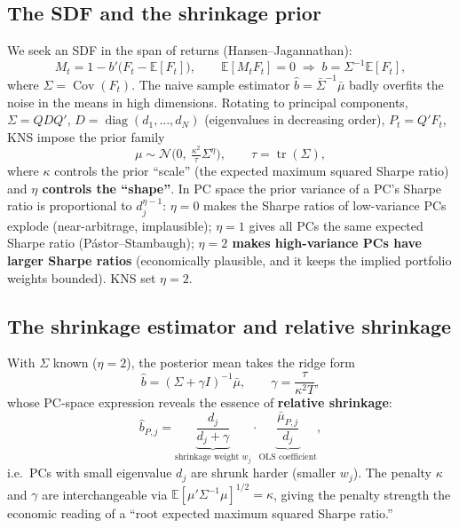 \documentclass[11pt,a4paper]{article}
\newcommand{\Eb}{\mathbb{E}}
\begin{document}
\subsection{The SDF and the shrinkage prior}
We seek an SDF in the span of returns (Hansen--Jagannathan):
\begin{equation}
  M_t = 1 - b'\big(F_t - \Eb[F_t]\big),\qquad \Eb[M_t F_t]=0
  \;\Rightarrow\; b = \Sigma^{-1}\Eb[F_t],
\end{equation}
where $\Sigma=\operatorname{Cov}(F_t)$. The naive sample estimator $\hat b=\bar\Sigma^{-1}\bar\mu$ badly overfits
the noise in the means in high dimensions. Rotating to principal components, $\Sigma=QDQ'$,
$D=\operatorname{diag}(d_1,\dots,d_N)$ (eigenvalues in decreasing order), $P_t=Q'F_t$, KNS impose the prior family
\begin{equation}
  \mu \sim \mathcal{N}\!\Big(0,\ \tfrac{\kappa^2}{\tau}\Sigma^{\eta}\Big),\qquad \tau=\operatorname{tr}(\Sigma),
  \label{eq:prior}
\end{equation}
where $\kappa$ controls the prior ``scale'' (the expected maximum squared Sharpe ratio) and \textbf{$\eta$
controls the ``shape''}. In PC space the prior variance of a PC's Sharpe ratio is proportional to $d_j^{\eta-1}$:
$\eta{=}0$ makes the Sharpe ratios of low-variance PCs explode (near-arbitrage, implausible); $\eta{=}1$ gives all
PCs the same expected Sharpe ratio (Pástor--Stambaugh); \textbf{$\eta{=}2$ makes high-variance PCs have larger
Sharpe ratios} (economically plausible, and it keeps the implied portfolio weights bounded). KNS set $\eta{=}2$.

\subsection{The shrinkage estimator and relative shrinkage}
With $\Sigma$ known ($\eta{=}2$), the posterior mean takes the ridge form
\begin{equation}
  \hat b = (\Sigma + \gamma I)^{-1}\bar\mu,\qquad \gamma=\frac{\tau}{\kappa^2 T},
  \label{eq:ridge}
\end{equation}
whose PC-space expression reveals the essence of \textbf{relative shrinkage}:
\begin{equation}
  \hat b_{P,j} = \underbrace{\frac{d_j}{d_j+\gamma}}_{\text{shrinkage weight }w_j}\cdot\underbrace{\frac{\bar\mu_{P,j}}{d_j}}_{\text{OLS coefficient}},
  \label{eq:bpc}
\end{equation}
i.e.\ PCs with small eigenvalue $d_j$ are shrunk harder (smaller $w_j$). The penalty $\kappa$ and $\gamma$ are
interchangeable via $\Eb[\mu'\Sigma^{-1}\mu]^{1/2}=\kappa$, giving the penalty strength the economic reading of a
``root expected maximum squared Sharpe ratio.''
\end{document}
